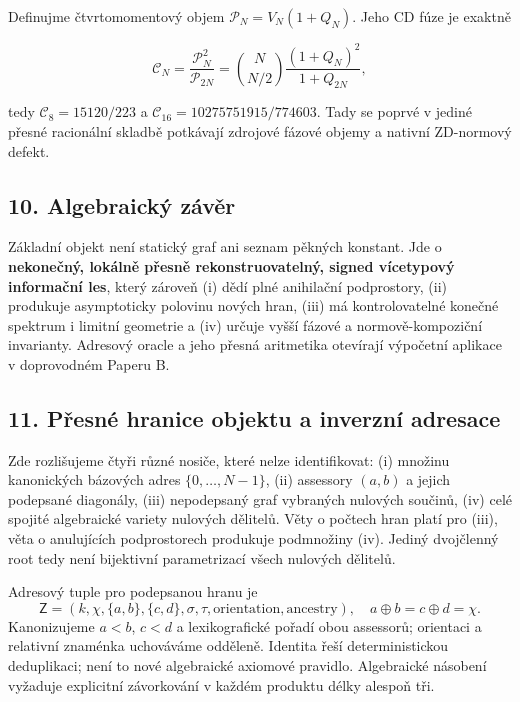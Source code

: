 \documentclass[
  10pt,
]{article}
\begin{document}
Definujme čtvrtomomentový objem \(\mathcal P_N=V_N(1+Q_N)\). Jeho CD
fúze je exaktně

\[
\mathcal C_N=\frac{\mathcal P_N^2}{\mathcal P_{2N}}=\binom N{N/2}\frac{(1+Q_N)^2}{1+Q_{2N}},
\tag{23}
\]

tedy \(\mathcal C_8=15120/223\) a
\(\mathcal C_{16}=10275751915/774603\). Tady se poprvé v jediné přesné
racionální skladbě potkávají zdrojové fázové objemy a nativní ZD-normový
defekt.

\subsection{10. Algebraický závěr}\label{algebraickuxfd-zuxe1vux11br}

Základní objekt není statický graf ani seznam pěkných konstant. Jde o
\textbf{nekonečný, lokálně přesně rekonstruovatelný, signed vícetypový
informační les}, který zároveň (i) dědí plné anihilační podprostory,
(ii) produkuje asymptoticky polovinu nových hran, (iii) má
kontrolovatelné konečné spektrum i limitní geometrie a (iv) určuje vyšší
fázové a normově-kompoziční invarianty. Adresový oracle a jeho přesná
aritmetika otevírají výpočetní aplikace v doprovodném Paperu B.

\subsection{11. Přesné hranice objektu a inverzní
adresace}\label{pux159esnuxe9-hranice-objektu-a-inverznuxed-adresace}

Zde rozlišujeme čtyři různé nosiče, které nelze identifikovat: (i)
množinu kanonických bázových adres \(\{0,\dots,N-1\}\), (ii) assessory
\((a,b)\) a jejich podepsané diagonály, (iii) nepodepsaný graf vybraných
nulových součinů, (iv) celé spojité algebraické variety nulových
dělitelů. Věty o počtech hran platí pro (iii), věta o anulujících
podprostorech produkuje podmnožiny (iv). Jediný dvojčlenný root tedy
není bijektivní parametrizací všech nulových dělitelů.

Adresový tuple pro podepsanou hranu je \[
\mathsf Z=(k,\chi,\{a,b\},\{c,d\},\sigma,\tau,\text{orientation},\text{ancestry}),\quad a\oplus b=c\oplus d=\chi.
\] Kanonizujeme \(a<b\), \(c<d\) a lexikografické pořadí obou assessorů;
orientaci a relativní znaménka uchováváme odděleně. Identita řeší
deterministickou deduplikaci; není to nové algebraické axiomové
pravidlo. Algebraické násobení vyžaduje explicitní závorkování v každém
produktu délky alespoň tři.
\end{document}
